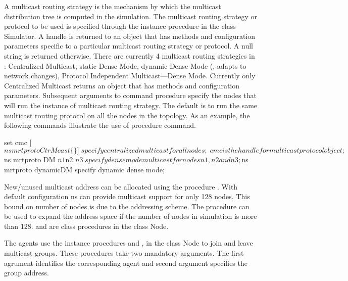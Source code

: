 A multicast routing strategy is the mechanism by which the multicast
distribution tree is computed in the simulation.  The multicast
routing strategy or protocol to be used is specified through the
instance procedure  in the class Simulator.
A handle is returned to an object that has methods
and configuration parameters specific to a particular multicast
routing strategy or protocol.  A null string is returned otherwise.
There are currently 4 multicast routing strategies in \ns: Centralized
Multicast, static Dense Mode, dynamic Dense Mode (\ie, adapts to
network changes), Protocol Independent Multicast---Dense Mode.
Currently only Centralized Multicast returns an object that has
methods and configuration parameters. Subsequent arguments to command
procedure  specify the nodes that will run the
instance of multicast routing strategy.
The default is to run the same multicast routing
protocol on all the nodes in the topology. As an example, the
following commands illustrate the use of procedure  command.
\begin{program}
        set cmc [$ns mrtproto CtrMcast \{\}]    \; specify centralized multicast for all nodes;
        \; cmc is the handle for multicast protocol object;
        $ns mrtproto DM $n1 $n2 $n3             \; specify dense mode multicast for nodes n1, n2 and n3;
        $ns mrtproto dynamicDM                  \; specify dynamic dense mode;
\end{program}

New/unused multicast address can be allocated using the procedure
. With default configuration ns can provide multicast
support for only 128 nodes. This bound on number of nodes is due to
the addressing scheme. The procedure  can be used to
expand the address space if the number of nodes in simulation is more
than 128.  and  are class
procedures in the class Node.

The agents use the instance procedures
 and , in
the class Node to join and leave multicast groups. These procedures
take two mandatory arguments. The first agrument identifies the
corresponding agent and second argument specifies the group address.

